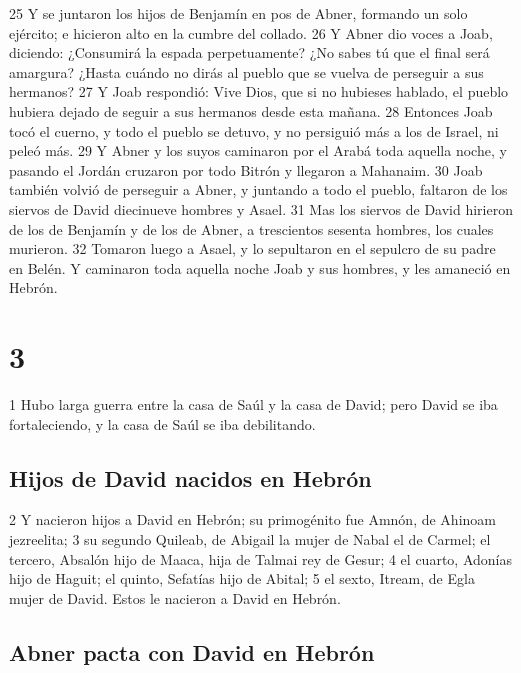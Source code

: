 25 Y se juntaron los hijos de Benjamín en pos de Abner, formando un solo ejército; e hicieron alto en la cumbre del collado.
26 Y Abner dio voces a Joab, diciendo: ¿Consumirá la espada perpetuamente? ¿No sabes tú que el final será amargura? ¿Hasta cuándo no dirás al pueblo que se vuelva de perseguir a sus hermanos?
27 Y Joab respondió: Vive Dios, que si no hubieses hablado, el pueblo hubiera dejado de seguir a sus hermanos desde esta mañana.
28 Entonces Joab tocó el cuerno, y todo el pueblo se detuvo, y no persiguió más a los de Israel, ni peleó más.
29 Y Abner y los suyos caminaron por el Arabá toda aquella noche, y pasando el Jordán cruzaron por todo Bitrón y llegaron a Mahanaim.
30 Joab también volvió de perseguir a Abner, y juntando a todo el pueblo, faltaron de los siervos de David diecinueve hombres y Asael.
31 Mas los siervos de David hirieron de los de Benjamín y de los de Abner, a trescientos sesenta hombres, los cuales murieron.
32 Tomaron luego a Asael, y lo sepultaron en el sepulcro de su padre en Belén. Y caminaron toda aquella noche Joab y sus hombres, y les amaneció en Hebrón. 

\chapter{3}

1 Hubo larga guerra entre la casa de Saúl y la casa de David; pero David se iba fortaleciendo, y la casa de Saúl se iba debilitando.

\section*{Hijos de David nacidos en Hebrón}

2 Y nacieron hijos a David en Hebrón; su primogénito fue Amnón, de Ahinoam jezreelita;
3 su segundo Quileab, de Abigail la mujer de Nabal el de Carmel; el tercero, Absalón hijo de Maaca, hija de Talmai rey de Gesur;
4 el cuarto, Adonías hijo de Haguit; el quinto, Sefatías hijo de Abital;
5 el sexto, Itream, de Egla mujer de David. Estos le nacieron a David en Hebrón.

\section*{Abner pacta con David en Hebrón}

